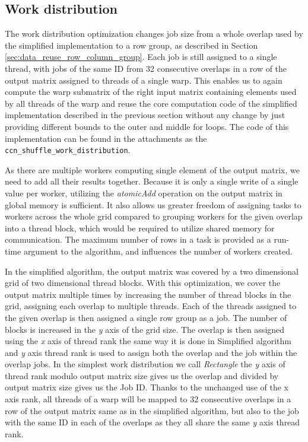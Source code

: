 \subsection{Work distribution}
\label{sec:warp_shuffle_work_dist}

The work distribution optimization changes job size from a whole overlap used by the simplified implementation to a row group, as described in Section \ref{sec:data_reuse_row_column_group}. Each job is still assigned to a single thread, with jobs of the same ID from 32 consecutive overlaps in a row of the output matrix assigned to threads of a single warp. This enables us to again compute the warp submatrix of the right input matrix containing elements used by all threads of the warp and reuse the core computation code of the simplified implementation described in the previous section without any change by just providing different bounds to the outer and middle for loops. The code of this implementation can be found in the attachments as the \texttt{ccn\_shuffle\_work\_distribution}.


As there are multiple workers computing single element of the output matrix, we need to add all their results together. Because it is only a single write of a single value per worker, utilizing the \textit{atomicAdd} \citep{site:cuda_reduction} operation on the output matrix in global memory is sufficient. It also allows us greater freedom of assigning tasks to workers across the whole grid compared to grouping workers for the given overlap into a thread block, which would be required to utilize shared memory for communication. The maximum number of rows in a task is provided as a run-time argument to the algorithm, and influences the number of workers created.


In the simplified algorithm, the output matrix was covered by a two dimensional grid of two dimensional thread blocks. With this optimization, we cover the output matrix multiple times by increasing the number of thread blocks in the grid, assigning each overlap to multiple threads. Each of the threads assigned to the given overlap is then assigned a single row group as a job. The number of blocks is increased in the \textit{y} axis of the grid size. The overlap is then assigned using the \textit{x} axis of thread rank the same way it is done in Simplified algorithm and \textit{y} axis thread rank  is used to assign both the overlap and the job within the overlap jobs. 
In the simplest work distribution we call \textit{Rectangle} the \textit{y} axis of thread rank modulo output matrix size gives us the overlap and divided by output matrix size gives us the Job ID. Thanks to the unchanged use of the x axis rank, all threads of a warp will be mapped to 32 consecutive overlaps in a row of the output matrix same as in the simplified algorithm, but also to the job with the same ID in each of the overlaps as they all share the same \textit{y} axis thread rank.


